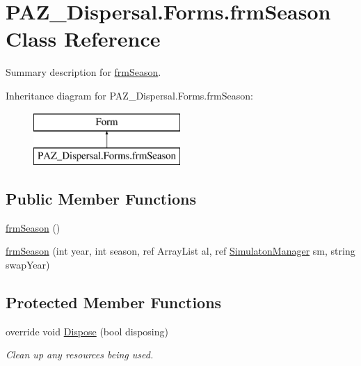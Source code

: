 \hypertarget{class_p_a_z___dispersal_1_1_forms_1_1frm_season}{\section{P\-A\-Z\-\_\-\-Dispersal.\-Forms.\-frm\-Season Class Reference}
\label{class_p_a_z___dispersal_1_1_forms_1_1frm_season}
}


Summary description for \hyperlink{class_p_a_z___dispersal_1_1_forms_1_1frm_season}{frm\-Season}.  


Inheritance diagram for P\-A\-Z\-\_\-\-Dispersal.\-Forms.\-frm\-Season\-:\begin{figure}[H]
\begin{center}
\leavevmode
\includegraphics[height=2.000000cm]{class_p_a_z___dispersal_1_1_forms_1_1frm_season}
\end{center}
\end{figure}
\subsection*{Public Member Functions}
\begin{DoxyCompactItemize}
\item 
\hyperlink{class_p_a_z___dispersal_1_1_forms_1_1frm_season_a106e677d11dd9d2a01c4f55f531aa85a}{frm\-Season} ()
\item 
\hyperlink{class_p_a_z___dispersal_1_1_forms_1_1frm_season_a4e7a37fc14e949a5325f67519260358e}{frm\-Season} (int year, int season, ref Array\-List al, ref \hyperlink{class_p_a_z___dispersal_1_1_simulaton_manager}{Simulaton\-Manager} sm, string swap\-Year)
\end{DoxyCompactItemize}
\subsection*{Protected Member Functions}
\begin{DoxyCompactItemize}
\item 
override void \hyperlink{class_p_a_z___dispersal_1_1_forms_1_1frm_season_acd01bf999ba37dfef19f2f977cdce9f6}{Dispose} (bool disposing)
\begin{DoxyCompactList}\small\item\em Clean up any resources being used. \end{DoxyCompactList}\end{DoxyCompactItemize}


